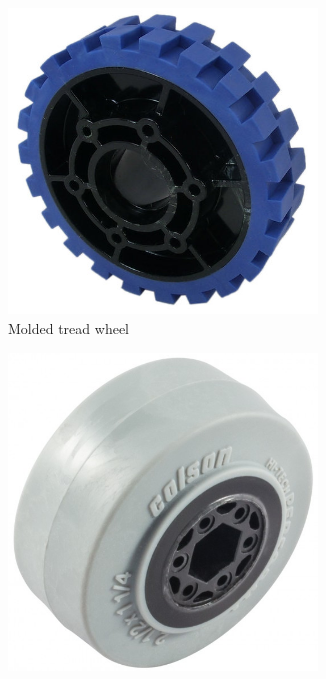 \documentclass[10pt,letterpaper]{book}
\begin{document}
	\begin{figure}[H]
		\begin{subfigure}[b]{.24\linewidth}
			\includegraphics[width=0.9\textwidth]{imgs/wheel_higrip.png}
			\caption{Molded tread wheel}
		\end{subfigure}\begin{subfigure}[b]{.24\linewidth}
			\includegraphics[width=0.9\textwidth]{imgs/wheel_colson.png}

\end{subfigure}
\end{figure}
\end{document}
